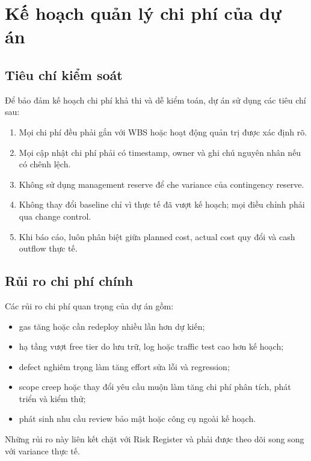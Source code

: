 \iffalse
\section{Kế hoạch quản lý chi phí của dự án}

\subsection{Tiêu chí kiểm soát}

Để bảo đảm kế hoạch chi phí khả thi và dễ kiểm toán, dự án sử dụng các tiêu chí sau:

\begin{enumerate}
  \item Mọi chi phí đều phải gắn với WBS hoặc hoạt động quản trị được xác định rõ.
  \item Mọi cập nhật chi phí phải có timestamp, owner và ghi chú nguyên nhân nếu có chênh lệch.
  \item Không sử dụng management reserve để che variance của contingency reserve.
  \item Không thay đổi baseline chỉ vì thực tế đã vượt kế hoạch; mọi điều chỉnh phải qua change control.
  \item Khi báo cáo, luôn phân biệt giữa planned cost, actual cost quy đổi và cash outflow thực tế.
\end{enumerate}

\subsection{Rủi ro chi phí chính}

Các rủi ro chi phí quan trọng của dự án gồm:

\begin{itemize}
  \item gas tăng hoặc cần redeploy nhiều lần hơn dự kiến;
  \item hạ tầng vượt free tier do lưu trữ, log hoặc traffic test cao hơn kế hoạch;
  \item defect nghiêm trọng làm tăng effort sửa lỗi và regression;
  \item scope creep hoặc thay đổi yêu cầu muộn làm tăng chi phí phân tích, phát triển và kiểm thử;
  \item phát sinh nhu cầu review bảo mật hoặc công cụ ngoài kế hoạch.
\end{itemize}

Những rủi ro này liên kết chặt với Risk Register và phải được theo dõi song song với variance thực tế.

